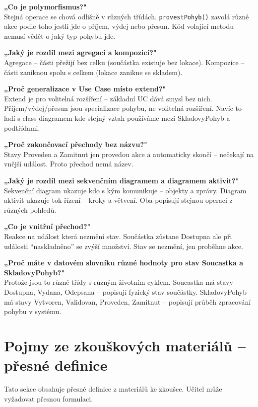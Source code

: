 \documentclass[12pt, a4paper]{article}
\begin{document}
\textbf{„Co je polymorfismus?"}\\
Stejná operace se chová odlišně v různých třídách. \texttt{provestPohyb()} zavolá různé akce podle toho jestli jde o příjem, výdej nebo přesun. Kód volající metodu nemusí vědět o jaký typ pohybu jde.

\textbf{„Jaký je rozdíl mezi agregací a kompozicí?"}\\
Agregace -- části přežijí bez celku (součástka existuje bez lokace). Kompozice -- části zaniknou spolu s celkem (lokace zanikne se skladem).

\textbf{„Proč generalizace v Use Case místo extend?"}\\
Extend je pro volitelná rozšíření -- základní UC dává smysl bez nich. Příjem/výdej/přesun jsou specializace pohybu, ne volitelná rozšíření. Navíc to ladí s class diagramem kde stejný vztah používáme mezi SkladovyPohyb a podtřídami.

\textbf{„Proč zakončovací přechody bez názvu?"}\\
Stavy Proveden a Zamitnut jen provedou akce a automaticky skončí -- nečekají na vnější událost. Proto přechod nemá název.

\textbf{„Jaký je rozdíl mezi sekvenčním diagramem a diagramem aktivit?"}\\
Sekvenční diagram ukazuje kdo s kým komunikuje -- objekty a zprávy. Diagram aktivit ukazuje tok řízení -- kroky a větvení. Oba popisují stejnou operaci z různých pohledů.

\textbf{„Co je vnitřní přechod?"}\\
Reakce na událost která nezmění stav. Součástka zůstane Dostupna ale při události ``naskladněno'' se zvýší množství. Stav se nezmění, jen proběhne akce.

\textbf{„Proč máte v datovém slovníku různé hodnoty pro stav Soucastka a SkladovyPohyb?"}\\
Protože jsou to různé třídy s různým životním cyklem. Soucastka má stavy Dostupna, Vydana, Odepsana -- popisují fyzický stav součástky. SkladovyPohyb má stavy Vytvoren, Validovan, Proveden, Zamitnut -- popisují průběh zpracování pohybu v systému.


\section{Pojmy ze zkouškových materiálů -- přesné definice}

Tato sekce obsahuje přesné definice z materiálů ke zkoušce. Učitel může vyžadovat přesnou formulaci.
\end{document}
